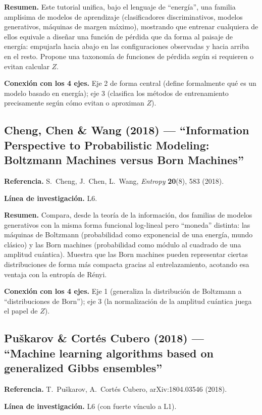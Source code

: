 \documentclass[12pt]{article}
\begin{document}
\textbf{Resumen.} Este tutorial unifica, bajo el lenguaje de ``energía'', una familia amplísima de modelos de aprendizaje (clasificadores discriminativos, modelos generativos, máquinas de margen máximo), mostrando que entrenar cualquiera de ellos equivale a diseñar una función de pérdida que da forma al paisaje de energía: empujarla hacia abajo en las configuraciones observadas y hacia arriba en el resto. Propone una taxonomía de funciones de pérdida según si requieren o evitan calcular $Z$.

\textbf{Conexión con los 4 ejes.} Eje 2 de forma central (define formalmente qué es un modelo basado en energía); eje 3 (clasifica los métodos de entrenamiento precisamente según cómo evitan o aproximan $Z$).

\subsection{Cheng, Chen \& Wang (2018) --- ``Information Perspective to Probabilistic Modeling: Boltzmann Machines versus Born Machines''}
\textbf{Referencia.} S.~Cheng, J.~Chen, L.~Wang, \textit{Entropy} \textbf{20}(8), 583 (2018). \cite{cheng2018}

\textbf{Línea de investigación.} L6.

\textbf{Resumen.} Compara, desde la teoría de la información, dos familias de modelos generativos con la misma forma funcional log-lineal pero ``moneda'' distinta: las máquinas de Boltzmann (probabilidad como exponencial de una energía, mundo clásico) y las Born machines (probabilidad como módulo al cuadrado de una amplitud cuántica). Muestra que las Born machines pueden representar ciertas distribuciones de forma más compacta gracias al entrelazamiento, acotando esa ventaja con la entropía de Rényi.

\textbf{Conexión con los 4 ejes.} Eje 1 (generaliza la distribución de Boltzmann a ``distribuciones de Born''); eje 3 (la normalización de la amplitud cuántica juega el papel de $Z$).

\subsection{Puškarov \& Cortés Cubero (2018) --- ``Machine learning algorithms based on generalized Gibbs ensembles''}
\textbf{Referencia.} T.~Puškarov, A.~Cortés Cubero, arXiv:1804.03546 (2018). \cite{puskarov2018}

\textbf{Línea de investigación.} L6 (con fuerte vínculo a L1).
\end{document}
